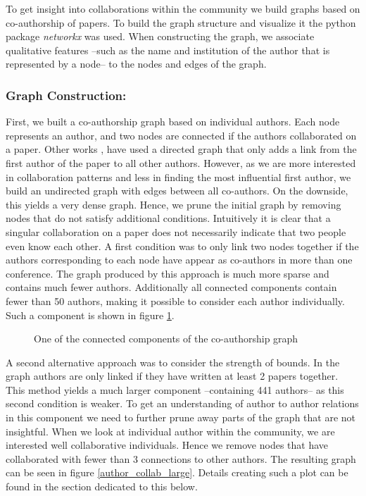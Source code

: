 \documentclass[article,twocolumn]{IEEEtran}
\begin{document}
To get insight into collaborations within the community we build graphs
based on co-authorship of papers. To build the graph structure and
visualize it the python package \emph{networkx} was used. When
constructing the graph, we associate qualitative features --such as the
name and institution of the author that is represented by a node-- to
the nodes and edges of the graph.

\hypertarget{graph-construction}{%
\subsubsection{Graph Construction:}\label{graph-construction}}

First, we built a co-authorship graph based on individual authors. Each
node represents an author, and two nodes are connected if the authors
collaborated on a paper. Other works \cite{cheong2009social},
\cite{hesford2006management} have used a directed graph that only adds a
link from the first author of the paper to all other authors. However,
as we are more interested in collaboration patterns and less in finding
the most influential first author, we build an undirected graph with
edges between all co-authors. On the downside, this yields a very dense
graph. Hence, we prune the initial graph by removing nodes that do not
satisfy additional conditions. Intuitively it is clear that a singular
collaboration on a paper does not necessarily indicate that two people
even know each other. A first condition was to only link two nodes
together if the authors corresponding to each node have appear as
co-authors in more than one conference. The graph produced by this
approach is much more sparse and contains much fewer authors.
Additionally all connected components contain fewer than 50 authors,
making it possible to consider each author individually. Such a
component is shown in figure \ref{fig_plot}.


    \begin{figure}
        \begin{center}\end{center}
        \caption{One of the connected components of the co-authorship graph}
        \label{fig_plot}
    \end{figure}
    
    A second alternative approach was to consider the strength of bounds. In
the graph authors are only linked if they have written at least 2 papers
together. This method yields a much larger component --containing 441
authors-- as this second condition is weaker. To get an understanding of
author to author relations in this component we need to further prune
away parts of the graph that are not insightful. When we look at
individual author within the community, we are interested well
collaborative individuals. Hence we remove nodes that have collaborated
with fewer than 3 connections to other authors. The resulting graph can
be seen in figure \ref{author_collab_large}. Details creating such a
plot can be found in the section dedicated to this below.
\end{document}
